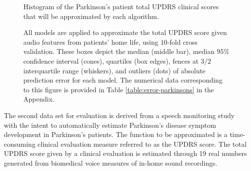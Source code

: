 \begin{figure}
  \centering
  \caption{Histogram of the Parkinson's patient total UPDRS clinical
    scores that will be approximated by each algorithm.}
  \label{fig:hist-parkinsons}

  \vspace{.3cm}

  \caption{All models are applied to approximate the total UPDRS score
    given audio features from patients' home life, using $10$-fold
    cross validation. These boxes depict the median (middle bar),
    median $95\%$ confidence interval (cones), quartiles (box edges),
    fences at $3/2$ interquartile range (whiskers), and outliers
    (dots) of absolute prediction error for each model. The numerical
    data corresponding to this figure is provided in Table
    \ref{table:error-parkinsons} in the Appendix.}
  \label{fig:error-parkinsons}
\end{figure}

The second data set for evaluation \cite{tsanas2010accurate} is
derived from a speech monitoring study with the intent to
automatically estimate Parkinson's disease symptom development in
Parkinson's patients. The function to be approximated is a
time-consuming clinical evaluation measure referred to as the UPDRS
score. The total UPDRS score given by a clinical evaluation is
estimated through 19 real numbers generated from biomedical voice
measures of in-home sound recordings.

